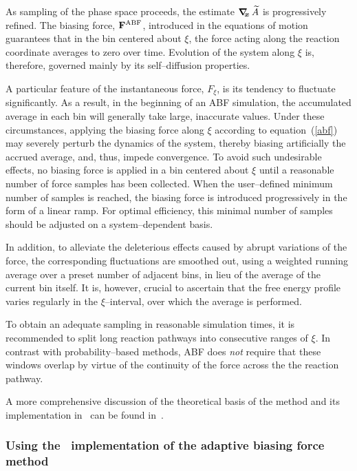 As sampling of the phase space proceeds, the estimate
$\mbox{\boldmath$\nabla_{\!\!x}\,$} \widetilde A$ is progressively refined. The biasing
force, ${\bf F}^{\rm ABF}$, introduced in the equations of
motion guarantees that in the bin centered about $\xi$,
the force acting along the reaction coordinate averages
to zero over time. Evolution of the system along $\xi$
is, therefore, governed mainly by its self--diffusion
properties.


A particular feature of the
instantaneous force, $F_\xi$,
is its tendency to fluctuate
significantly.
As a result, in the beginning of an ABF simulation,
the accumulated average in each bin will generally
take large, inaccurate
values. Under these circumstances,
applying the biasing force along $\xi$ according
to equation~({\ref{abf}}) may severely perturb
the dynamics of the system, thereby
biasing artificially the accrued average, and,
thus, impede convergence.
To avoid such undesirable effects,
no biasing force is applied in a bin centered about $\xi$
until a reasonable number of force samples
has been collected. When the user--defined minimum number
of samples is reached, the biasing force
is introduced progressively in the form
of a linear ramp.
For optimal efficiency, this minimal number of samples
should be adjusted on a system--dependent basis.


In addition, to alleviate the deleterious
effects caused by abrupt variations of the force,
the corresponding fluctuations are smoothed out,
using a weighted running average over a preset number
of adjacent bins, in lieu of the average of the
current bin itself. It is, however, crucial to ascertain
that the free energy profile varies regularly
in the $\xi$--interval, over which the
average is performed.

To obtain an adequate sampling in reasonable
simulation times, it is recommended to split long reaction
pathways into consecutive ranges of $\xi$. In contrast with
probability--based methods, ABF does
{\itshape not} require that these windows overlap by
virtue of the continuity of the force across the
the reaction pathway.


A more comprehensive discussion of the theoretical basis of
the method and its implementation
in \namd\ can be found in~\cite{heni_04_1}.



\subsubsection{Using the \namd\ implementation of the adaptive biasing force method}


